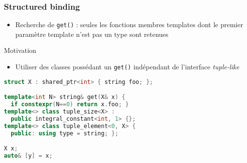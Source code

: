 \documentclass[C++.tex]{subfiles}
\begin{document}
\begin{frame}[fragile]
	\frametitle{Structured binding}
	\begin{itemize}
		\item Recherche de \lstinline|get()| : seules les fonctions membres templates dont le premier paramètre template n'est pas un type sont retenues
	\end{itemize}

	\begin{block}{Motivation}
		\begin{itemize}
			\item Utiliser des classes possédant un \lstinline|get()| indépendant de l'interface \textit{tuple-like}
		\end{itemize}
	\end{block}

	\begin{lstlisting}[language=C++]
struct X : shared_ptr<int> { string foo; };

template<int N> string& get(X& x) { 
  if constexpr(N==0) return x.foo; }
template<> class tuple_size<X> : 
  public integral_constant<int, 1> {};
template<> class tuple_element<0, X> {
  public: using type = string; };

X x;
auto& [y] = x;\end{lstlisting}

\end{frame}
\end{document}
